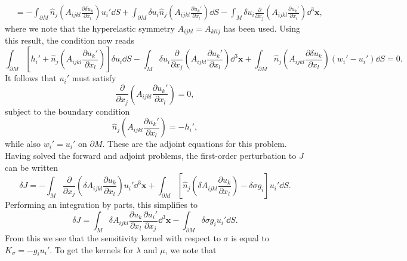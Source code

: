 \documentclass[a4paper,10pt]{paper}
\begin{document}
\begin{enumerate}
\begin{align*}
    &=-\int_{\partial M}\hat{n}_{j}\left(A_{ijkl}\frac{\partial\delta u_{k}}{\partial x_{l}}\right)u_{i}'\dd S+\int_{\partial M}\delta u_{i}\hat{n}_{j}\left(A_{ijkl}\frac{\partial u_{k}'}{\partial x_{l}}\right)\dd S -\int_{M}\delta u_{i}\frac{\partial}{\partial x_{j}}\left(A_{ijkl}\frac{\partial u_{k}'}{\partial x_{l}}\right)\dd^{3}\mathbf{x},
\end{align*}
where we note that the hyperelastic symmetry $A_{ijkl}=A_{klij}$ has been used. Using this result, the condition now reads
\begin{equation*}
    \int_{\partial M}[h_{i}'+\hat{n}_{j}\left(A_{ijkl}\frac{\partial u_{k}'}{\partial x_{l}}\right)]\delta u_{i}\dd S-\int_{M}\delta u_{i}\frac{\partial}{\partial x_{j}}\left(A_{ijkl}\frac{\partial u_{k}'}{\partial x_{l}}\right)\dd^{3}\mathbf{x} +\int_{\partial M}\hat{n}_{j}\left(A_{ijkl}\frac{\partial\delta u_{k}}{\partial x_{l}}\right)(w_{i}'-u_{i}')\dd S=0.
\end{equation*}
It follows that $u_{i}'$ must satisfy
\begin{equation*}
    \frac{\partial}{\partial x_{j}}\left(A_{ijkl}\frac{\partial u_{k}'}{\partial x_{l}}\right)=0,
\end{equation*}
subject to the boundary condition
\begin{equation*}
    \hat{n}_{j}\left(A_{ijkl}\frac{\partial u_{k}'}{\partial x_{l}}\right)=-h_{i}',
\end{equation*}
while also $w_{i}'=u_{i}'$ on $\partial M$. These are the adjoint equations for this problem. Having solved the forward and adjoint problems, the first-order perturbation to $J$ can be written
\begin{equation*}
    \delta J = -\int_{M}\frac{\partial}{\partial x_{j}}\left(\delta A_{ijkl}\frac{\partial u_{k}}{\partial x_{l}}\right)u_{i}'\dd^{3}\mathbf{x} + \int_{\partial M}\left[\hat{n}_{j}\left(\delta A_{ijkl}\frac{\partial u_{k}}{\partial x_{l}}\right)-\delta\sigma g_{i}\right]u_{i}'\dd S.
\end{equation*}
Performing an integration by parts, this simplifies to
\begin{equation*}
    \delta J=\int_{M}\delta A_{ijkl}\frac{\partial u_{k}}{\partial x_{l}}\frac{\partial u_{i}'}{\partial x_{j}}\dd^{3}\mathbf{x}-\int_{\partial M}\delta\sigma g_{i}u_{i}'\dd S.
\end{equation*}
From this we see that the sensitivity kernel with respect to $\sigma$ is equal to $K_{\sigma}=-g_{i}u_{i}'$. To get the kernels for $\lambda$ and $\mu$, we note that
\begin{equation*}

\end{equation*}
\end{enumerate}
\end{document}
